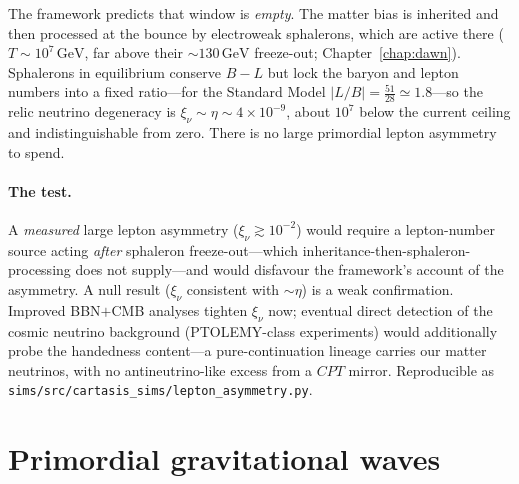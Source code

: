The framework predicts that window is \emph{empty}. The matter bias is inherited
and then processed at the bounce by electroweak sphalerons, which are active there
($T\sim10^{7}\,\mathrm{GeV}$, far above their $\sim\!130\,\mathrm{GeV}$ freeze-out;
Chapter~\ref{chap:dawn}). Sphalerons in equilibrium conserve $B-L$ but lock the
baryon and lepton numbers into a fixed ratio---for the Standard Model
$|L/B|=\tfrac{51}{28}\simeq1.8$---so the relic neutrino degeneracy is
$\xi_\nu\sim\eta\sim4\times10^{-9}$, about $10^{7}$ below the current ceiling and
indistinguishable from zero. There is no large primordial lepton asymmetry to
spend.

\paragraph{The test.} A \emph{measured} large lepton asymmetry
($\xi_\nu\gtrsim10^{-2}$) would require a lepton-number source acting \emph{after}
sphaleron freeze-out---which inheritance-then-sphaleron-processing does not
supply---and would disfavour the framework's account of the asymmetry. A null
result ($\xi_\nu$ consistent with $\sim\eta$) is a weak confirmation. Improved
BBN$+$CMB analyses tighten $\xi_\nu$ now; eventual direct detection of the cosmic
neutrino background (PTOLEMY-class experiments) would additionally probe the
handedness content---a pure-continuation lineage carries our matter neutrinos,
with no antineutrino-like excess from a $CPT$ mirror. Reproducible as
\texttt{sims/src/cartasis\_sims/lepton\_asymmetry.py}.

\section{Primordial gravitational waves}
\label{sec:tensor-r}

